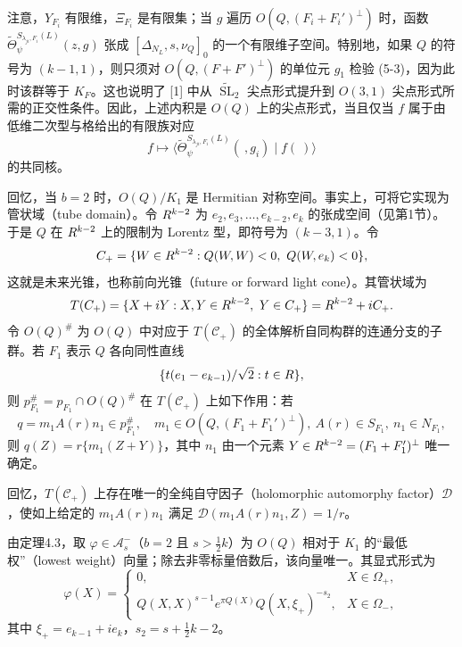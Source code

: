 注意，$Y_{F_i}$ 有限维，$\Xi_{F_i}$ 是有限集；当 $g$ 遍历 $O(Q,(F_i+F_i')^\perp)$ 时，函数
$\widetilde\Theta_\psi^{S_{\lambda_{ji},F_i}(L)}(z,g)$ 张成 $[\Delta_{N_L},s,\nu_Q]_0$ 的一个有限维子空间。特别地，如果 $Q$ 的符号为 $(k-1,1)$，则只须对 $O(Q,(F+F')^\perp)$ 的单位元 $g_1$ 检验 (5-3)，因为此时该群等于 $K_F$。这也说明了 [1] 中从 $\widetilde{\operatorname{SL}}_2$ 尖点形式提升到 $O(3,1)$ 尖点形式所需的正交性条件。因此，上述内积是 $O(Q)$ 上的尖点形式，当且仅当 $f$ 属于由低维二次型与格给出的有限族对应
\[
 f\longmapsto\langle\widetilde\Theta_\psi^{S_{\lambda_{ji},F_i}(L)}(\ ,g_i)\mid f(\ )\rangle
\]
的共同核。

回忆，当 $b=2$ 时，$O(Q)/K_1$ 是 Hermitian 对称空间。事实上，可将它实现为管状域（tube domain）。令 $R^{k-2}$ 为 $e_2,e_3,\ldots,e_{k-2},e_k$ 的张成空间（见第1节）。于是 $Q$ 在 $R^{k-2}$ 上的限制为 Lorentz 型，即符号为 $(k-3,1)$。令
\[
 \mathcal C_+=\{W\in\R^{k-2}:Q(W,W)<0,\ Q(W,e_k)<0\},
\]
这就是未来光锥，也称前向光锥（future or forward light cone）。其管状域为
\[
 T(C_+)=\{X+iY:X,Y\in R^{k-2},\ Y\in C_+\}
 =R^{k-2}+iC_+.
\]
令 $O(Q)^\#$ 为 $O(Q)$ 中对应于 $T(\mathcal C_+)$ 的全体解析自同构群的连通分支的子群。若 $F_1$ 表示 $Q$ 各向同性直线
\[
 \{t(e_1-e_{k-1})/\sqrt2:t\in R\},
\]
则 $p_{F_1}^\#=p_{F_1}\cap O(Q)^\#$ 在 $T(\mathcal C_+)$ 上如下作用：若
\[
 q=m_1A(r)n_1\in p_{F_1}^\#,
 \quad m_1\in O(Q,(F_1+F_1')^\perp),\ A(r)\in S_{F_1},\ n_1\in N_{F_1},
\]
则 $q(Z)=r\{m_1(Z+Y)\}$，其中 $n_1$ 由一个元素
$Y\in R^{k-2}=(F_1+F_1')^\perp$ 唯一确定。

回忆，$T(\mathcal C_+)$ 上存在唯一的全纯自守因子（holomorphic automorphy factor）$\mathcal D$，使如上给定的 $m_1A(r)n_1$ 满足
$\mathcal D(m_1A(r)n_1,Z)=1/r$。

由定理4.3，取 $\varphi\in\mathcal A_s^-$（$b=2$ 且 $s>\tfrac12k$）为 $O(Q)$ 相对于 $K_1$ 的“最低权”（lowest weight）向量；除去非零标量倍数后，该向量唯一。其显式形式为
\begin{equation}
 \varphi(X)=\begin{cases}
 0,&X\in\Omega_+,\\
 Q(X,X)^{s-1}e^{\pi Q(X)}Q(X,\xi_+)^{-s_2},&X\in\Omega_-,
 \end{cases}\tag{6-1}
\end{equation}
其中 $\xi_+=e_{k-1}+ie_k$，$s_2=s+\tfrac12k-2$。

